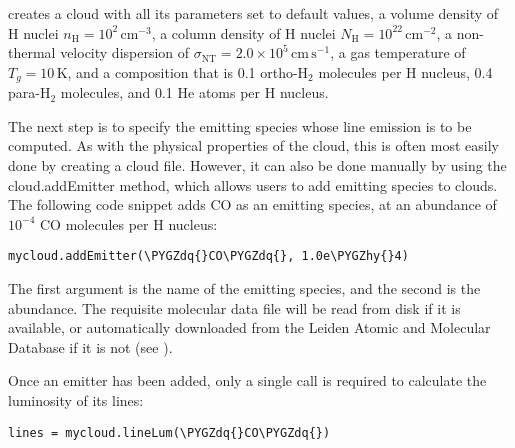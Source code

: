 \documentclass[letterpaper,10pt,english]{sphinxmanual}
\def\PYGZhy{\char`\-}
\def\PYGZdq{\char`\"}
\begin{document}
creates a cloud with all its parameters set to default values, a
volume density of H nuclei \(n_{\mathrm{H}} =
10^2\,\mathrm{cm}^{-3}\), a column density of H nuclei
\(N_{\mathrm{H}} = 10^{22}\,\mathrm{cm}^{-2}\), a non-thermal
velocity dispersion of \(\sigma_{\mathrm{NT}} = 2.0 \times
10^5\,\mathrm{cm}\,\mathrm{s}^{-1}\), a gas temperature of \(T_g =
10\,\mathrm{K}\), and a composition that is 0.1
ortho-\(\mathrm{H}_2\) molecules per H nucleus, 0.4
para-\(\mathrm{H}_2\) molecules, and 0.1 He atoms per H nucleus.

The next step is to specify the emitting species whose line emission
is to be computed. As with the physical properties of the cloud, this
is often most easily done by creating a cloud file. However, it can
also be done manually by using the cloud.addEmitter method, which
allows users to add emitting species to clouds. The following code
snippet adds CO as an emitting species, at an abundance of
\(10^{-4}\) CO molecules per H nucleus:

\begin{Verbatim}[commandchars=\\\{\}]
mycloud.addEmitter(\PYGZdq{}CO\PYGZdq{}, 1.0e\PYGZhy{}4)
\end{Verbatim}

The first argument is the name of the emitting species, and the second
is the abundance. The requisite molecular data file will be read from
disk if it is available, or automatically downloaded from the Leiden
Atomic and Molecular Database if it is not (see {\hyperref[data:sec\string-data]{}}).

Once an emitter has been added, only a single call is required to
calculate the luminosity of its lines:

\begin{Verbatim}[commandchars=\\\{\}]
lines = mycloud.lineLum(\PYGZdq{}CO\PYGZdq{})
\end{Verbatim}
\end{document}
